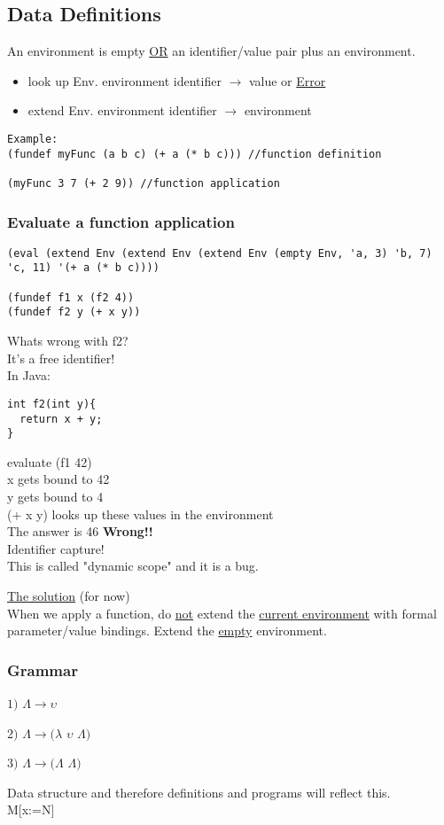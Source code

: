 \documentclass{article}
\begin{document}
\subsection*{Data Definitions}
An environment is empty \underline{OR} an identifier/value pair plus an environment.
\begin{itemize}
\item look up Env. environment identifier $\rightarrow$ value or \underline{Error}
\item extend Env. environment identifier $\rightarrow$ environment
\end{itemize}
\begin{verbatim}
Example: 
(fundef myFunc (a b c) (+ a (* b c))) //function definition

(myFunc 3 7 (+ 2 9)) //function application
\end{verbatim}

\subsubsection*{Evaluate a function application}
\begin{verbatim}
(eval (extend Env (extend Env (extend Env (empty Env, 'a, 3) 'b, 7) 'c, 11) '(+ a (* b c))))

(fundef f1 x (f2 4))
(fundef f2 y (+ x y))
\end{verbatim}
Whats wrong with f2?\\
It's a free identifier!\\
In Java:
\begin{verbatim}
int f2(int y){
  return x + y;
}
\end{verbatim}
evaluate (f1 42)\\
 x gets bound to 42\\
 y gets bound to 4\\
 (+ x y) looks up these values in the environment\\
 The answer is 46 \textbf{Wrong!!}\\
\bigskip
Identifier capture!\\
This is called "dynamic scope" and it is a bug.
\bigskip
\begin{flushleft}
\underline{The solution} (for now)\\
When we apply a function, do \underline{not} extend the \underline{current environment} with formal parameter/value bindings. Extend the \underline{empty} environment.
\end{flushleft}

\subsubsection*{Grammar}
\begin{flushleft}
$1)$ $\Lambda\rightarrow\upsilon$

$2)$ $\Lambda\rightarrow(\lambda$ 
$\upsilon$
$\Lambda)$

$3)$ $\Lambda\rightarrow(\Lambda$
$\Lambda)$

Data structure and therefore definitions and programs will reflect this.\\
\bigskip
M[x:=N]\\
\end{flushleft}
\end{document}
